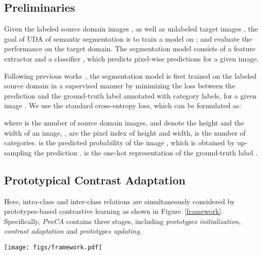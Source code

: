 \documentclass[runningheads]{llncs}
\begin{document}
\subsection{Preliminaries}
Given the labeled source domain images , as well as unlabeled target images , the goal of UDA of semantic segmentation is to train a model on ; and evaluate the performance on the target domain. The segmentation model consists of a feature extractor  and a classifier , which predicts pixel-wise predictions for a given image.


Following previous works~\cite{hoffman2018cycada, wang2020classes, li2021semantic}, the segmentation model is first trained on the labeled source domain in a supervised manner by minimizing the loss between the prediction  and the ground-truth label  annotated with  category labels, for a given image . We use the standard cross-entropy loss, which can be formulated as:


where  is the number of source domain images,  and  denote the height and the width of an image, ,  are the pixel index of height and width,  is the number of categories.  is the predicted probability of the image , which is obtained by up-sampling the prediction .  is the one-hot representation of the ground-truth label .

\subsection{Prototypical Contrast Adaptation}
Here, intra-class and inter-class relations are simultaneously considered by prototypes-based contrastive learning as shown in Figure~\ref{framework}. Specifically, {\em ProCA} contains three stages, including {\em prototypes initialization}, {\em contrast adaptation} and {\em prototypes updating}.

\begin{figure*}[t]
\centering
\texttt{[image: figs/framework.pdf]}
\caption{The framework of proposed ProCA. For given source image  and target image , features  and  of two domains are first obtained through a shared feature encoder . Then, outputs  and  are obtained by a shared classifier . After obtaining initialized prototypes, a pixel from two domains acts as a contrastive manner with class-aware prototypes to directly model inter-class constraints. We conduct such prototypical contrast adaption on both feature-level and output-level. At last, the initialized prototypes are also updated during training to enhance the domain-invariant representational ability. }
\label{framework}
\end{figure*}
\end{document}
